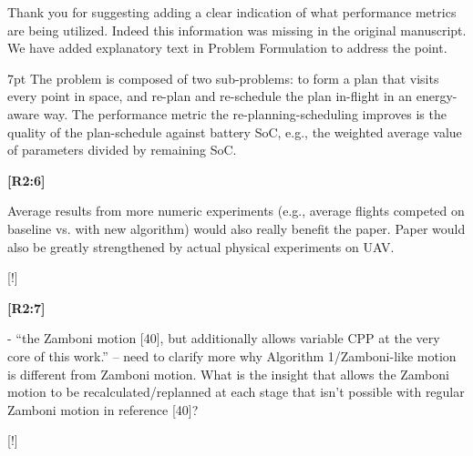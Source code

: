 \documentclass[10pt]{letter}
\newenvironment{formal}{%
  \def\FrameCommand{%
    \hspace{1pt}%
    {\color{red}\vrule width 2pt}%
    {\color{formalshade}\vrule width 4pt}%
    \colorbox{formalshade}%
  }%
  \MakeFramed{\advance\hsize-\width\FrameRestore}%
  \noindent\hspace{-4.55pt}%
  \begin{adjustwidth}{}{7pt}%
  \vspace{2pt}\vspace{2pt}%
}
{%
  \vspace{2pt}\end{adjustwidth}\endMakeFramed%
}
\begin{document}
{\color{blue} 
  
{\hspace*{-4.5em}{[R2:5]}\vspace*{-1.9em}}
  
Thank you for suggesting adding a clear indication of what performance metrics are being utilized. Indeed this information was missing in the original manuscript. We have added explanatory text in Problem Formulation to address the point.

\begin{formal}\color{black}
  The problem %
is composed of two sub-problems{\color{blue}: }%
to form a %
plan that visits every point in space, {\color{blue}and }%
re-plan and re-schedule the plan in-flight in an energy-aware way. %
{\color{blue} The performance metric the re-planning-scheduling %
improves is %
the quality of the plan-schedule against battery SoC, e.g., the weighted average value of parameters divided by remaining %
SoC.%
\vspace*{1ex}
}
\end{formal}
}

  {\hspace*{-4.5em}\textbf{[R2:6]}\vspace*{-1.9em}}

  Average results from more numeric experiments (e.g., average flights competed on baseline vs. with new algorithm) would also really benefit the paper. Paper would also be greatly strengthened by actual physical experiments on UAV.
  
  {\color{blue} 
  
  {\hspace*{-4.5em}{[R2:6]}\vspace*{-1.9em}}
  
  [!]}

{\hspace*{-4.5em}\textbf{[R2:7]}\vspace*{-1.9em}}

- ``the Zamboni motion [40], but additionally allows variable CPP at the very core of this work.'' -- need to clarify more why Algorithm 1/Zamboni-like motion is different from Zamboni motion. What is the   insight that allows the Zamboni motion to be recalculated/replanned at each stage that isn't possible with regular Zamboni motion in reference [40]? 

{\color{blue} 
  
{\hspace*{-4.5em}{[R2:7]}\vspace*{-1.9em}}
  
[!]}
\end{document}
